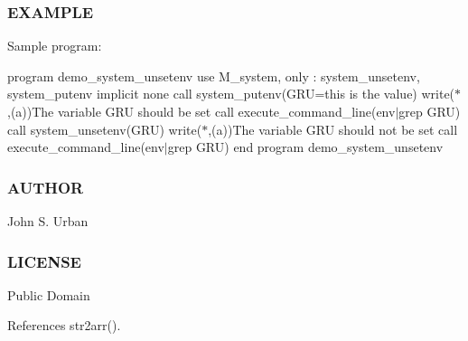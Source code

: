 \subsubsection*{E\+X\+A\+M\+P\+LE}

Sample program\+:

program demo\+\_\+system\+\_\+unsetenv use M\+\_\+system, only \+: system\+\_\+unsetenv, system\+\_\+putenv implicit none call system\+\_\+putenv(\textquotesingle{}G\+RU=this is the value\textquotesingle{}) write($\ast$,\textquotesingle{}(a)\textquotesingle{})\textquotesingle{}The variable G\+RU should be set\textquotesingle{} call execute\+\_\+command\+\_\+line(\textquotesingle{}env$\vert$grep G\+RU\textquotesingle{}) call system\+\_\+unsetenv(\textquotesingle{}G\+RU\textquotesingle{}) write($\ast$,\textquotesingle{}(a)\textquotesingle{})\textquotesingle{}The variable G\+RU should not be set\textquotesingle{} call execute\+\_\+command\+\_\+line(\textquotesingle{}env$\vert$grep G\+RU\textquotesingle{}) end program demo\+\_\+system\+\_\+unsetenv

\subsubsection*{A\+U\+T\+H\+OR}

John S. Urban \subsubsection*{L\+I\+C\+E\+N\+SE}

Public Domain 

References str2arr().


